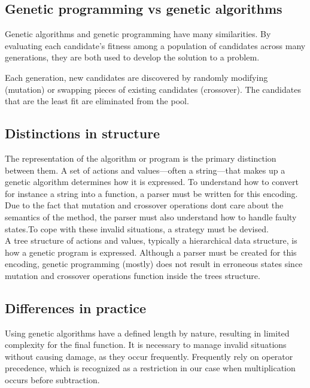 \subsection{Genetic programming vs genetic algorithms}
\label{genetic-programming-vs-genetic-algorithms}
Genetic algorithms and genetic programming have many similarities. By evaluating each candidate's fitness among a population of candidates across many generations, they are both used to develop the solution to a problem.

Each generation, new candidates are discovered by randomly modifying (mutation) or swapping pieces of existing candidates (crossover). The candidates that are the least fit are eliminated from the pool.

\subsection{Distinctions in structure}
\label{Distinctions in structure}
The representation of the algorithm or program is the primary
distinction between them.
A set of actions and values---often a string---that makes up a genetic algorithm determines how it is expressed. To understand how to convert for instance a string into a function, a parser must be written for this encoding. Due to the fact that mutation and crossover operations don\textquotesingle t care about the semantics of the method, the parser must also understand how to handle faulty states.To cope with these invalid situations, a strategy must be devised.\\

A tree structure of actions and values, typically a hierarchical data structure, is how a genetic program is expressed. Although a parser must be created for this encoding, genetic programming (mostly) does not result in erroneous states since mutation and crossover operations function inside the tree\textquotesingle s structure.

\subsection{Differences in practice}
\label{Differences in practice}

Using genetic algorithms have a defined length by nature, resulting in limited complexity for the final function. It is necessary to manage invalid situations without causing damage, as they occur frequently. Frequently rely on operator precedence, which is recognized as a restriction in our case when multiplication occurs before subtraction.\\

